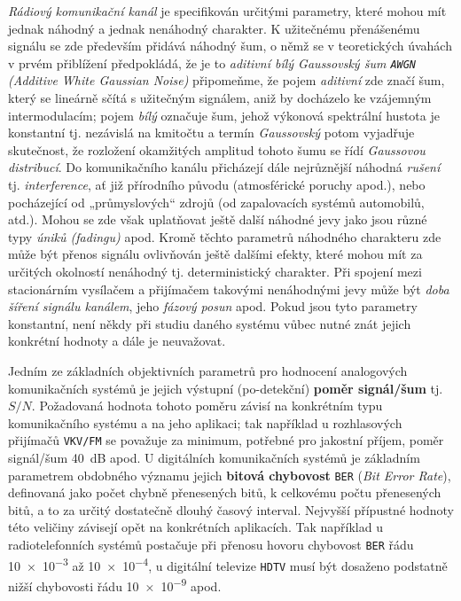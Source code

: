     \emph{Rádiový komunikační kanál} je specifikován určitými parametry, které mohou mít jednak 
    náhodný a jednak nenáhodný charakter. K užitečnému přenášenému signálu se zde především přidává 
    náhodný šum, o němž se v teoretických úvahách v prvém přiblížení předpokládá, že je to 
    \emph{aditivní bílý Gaussov\-ský šum \texttt{AWGN} (Additive White Gaussian Noise)} připomeňme, 
    že pojem \emph{aditivní} zde značí šum, který se lineárně sčítá s užitečným signálem, aniž by 
    docházelo ke vzájemným intermodulacím; pojem \emph{bílý} označuje šum, jehož výkonová 
    spektrální hustota je konstantní tj. nezávislá na kmitočtu a termín \emph{Gaussovský} potom 
    vyjadřuje skutečnost, že rozložení okamžitých amplitud tohoto šumu se řídí \emph{Gaussovou 
    distribucí}. Do komunikačního kanálu přicházejí dále nejrůznější náhodná \emph{rušení} tj. 
    \emph{interference}, ať již přírodního původu (atmosférické poruchy apod.), nebo pocházející od 
    „průmyslových“ zdrojů (od zapalovacích systémů automobilů, atd.). Mohou se zde však uplatňovat 
    ještě další náhodné jevy jako jsou různé typy \emph{úniků (fadingu)} apod. Kromě těchto 
    parametrů náhodného charakteru zde může být přenos signálu ovlivňován ještě dalšími efekty, 
    které mohou mít za určitých okolností nenáhodný tj. deterministický charakter. Při spojení mezi 
    stacionárním vysílačem a přijímačem takovými nenáhodnými jevy může být \emph{doba šíření 
    signálu kanálem}, jeho \emph{fázový posun} apod. Pokud jsou tyto parametry konstantní, není 
    někdy při studiu daného systému vůbec nutné znát jejich konkrétní hodnoty a dále je neuvažovat.
    
    Jedním ze základních objektivních parametrů pro hodnocení analogových komunikačních systémů je 
    jejich výstupní (po-detekční) \textbf{poměr signál/šum} tj. \(S/N\). Požadovaná hodnota tohoto 
    poměru závisí na konkrétním typu komunikačního systému a na jeho aplikaci; tak například u 
    rozhlasových přijímačů \texttt{VKV/FM} se považuje za minimum, potřebné pro jakostní příjem, 
    poměr signál/šum \SI{40}{\dB} apod. U digitálních komunikačních systémů je základním parametrem 
    obdobného významu jejich \textbf{bitová chybovost} \texttt{BER} (\emph{Bit Error Rate}), 
    definovaná jako počet chybně přenesených bitů, k celkovému počtu přenesených bitů, a to za 
    určitý dostatečně dlouhý časový interval. Nejvyšší přípustné hodnoty této ve\-li\-či\-ny 
    závisejí opět na konkrétních aplikacích. Tak například u radiotelefonních systémů postačuje při 
    přenosu hovoru chybovost \texttt{BER} řádu \num{10e-3} až \num{10e-4}, u digitální televize 
    \texttt{HDTV} musí být dosaženo podstatně nižší chybovosti řádu \num{10e-9} apod.
    
